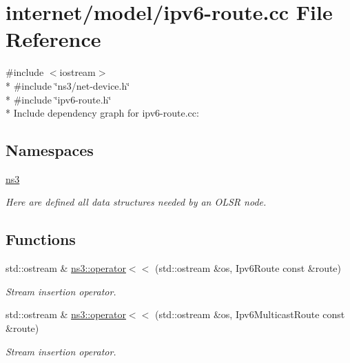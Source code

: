 \hypertarget{ipv6-route_8cc}{}\section{internet/model/ipv6-\/route.cc File Reference}
\label{ipv6-route_8cc}
{\ttfamily \#include $<$iostream$>$}\\*
{\ttfamily \#include \char`\"{}ns3/net-\/device.\+h\char`\"{}}\\*
{\ttfamily \#include \char`\"{}ipv6-\/route.\+h\char`\"{}}\\*
Include dependency graph for ipv6-\/route.cc\+:
\subsection*{Namespaces}
\begin{DoxyCompactItemize}
\item 
 \hyperlink{namespacens3}{ns3}
\begin{DoxyCompactList}\small\item\em Here are defined all data structures needed by an O\+L\+SR node. \end{DoxyCompactList}\end{DoxyCompactItemize}
\subsection*{Functions}
\begin{DoxyCompactItemize}
\item 
std\+::ostream \& \hyperlink{namespacens3_a057108a75ec52fb2255968b42c883a5f}{ns3\+::operator$<$$<$} (std\+::ostream \&os, Ipv6\+Route const \&route)
\begin{DoxyCompactList}\small\item\em Stream insertion operator. \end{DoxyCompactList}\item 
std\+::ostream \& \hyperlink{namespacens3_a348db539135f304849c2cf3401f8f419}{ns3\+::operator$<$$<$} (std\+::ostream \&os, Ipv6\+Multicast\+Route const \&route)
\begin{DoxyCompactList}\small\item\em Stream insertion operator. \end{DoxyCompactList}\end{DoxyCompactItemize}
